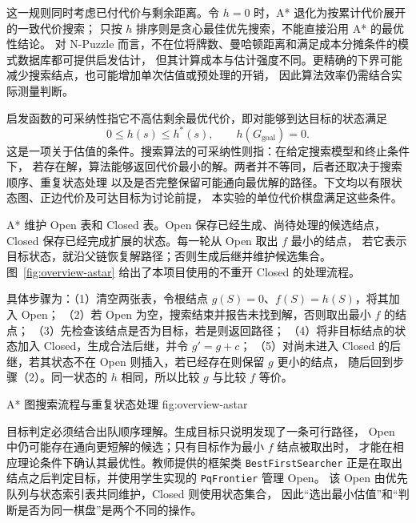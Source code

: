 这一规则同时考虑已付代价与剩余距离。令 $h=0$ 时，A* 退化为按累计代价展开的一致代价搜索；
只按 $h$ 排序则是贪心最佳优先搜索，不能直接沿用 A* 的最优性结论。
对 N-Puzzle 而言，不在位将牌数、曼哈顿距离和满足成本分摊条件的模式数据库都可提供启发估计，
但其计算成本与估计强度不同。更精确的下界可能减少搜索结点，也可能增加单次估值或预处理的开销，
因此算法效率仍需结合实际测量判断。


启发函数的可采纳性指它不高估剩余最优代价，即对能够到达目标的状态满足
\begin{equation}
  0\leq h(s)\leq h^*(s),\qquad h(G_{\mathrm{goal}})=0.
  \label{eq:overview-admissible}
\end{equation}
这是一项关于估值的条件。搜索算法的可采纳性则指：在给定搜索模型和终止条件下，
若存在解，算法能够返回代价最小的解。两者并不等同，后者还取决于搜索顺序、重复状态处理
以及是否完整保留可能通向最优解的路径。下文均以有限状态图、正边代价及可达目标为讨论前提，
本实验的单位代价棋盘满足这些条件。


A* 维护 Open 表和 Closed 表。Open 保存已经生成、尚待处理的候选结点，
Closed 保存已经完成扩展的状态。每一轮从 Open 取出 $f$ 最小的结点，
若它表示目标状态，就沿父链恢复解路径；否则生成后继并维护候选集合。
图~\ref{fig:overview-astar} 给出了本项目使用的不重开 Closed 的处理流程。

具体步骤为：（1）清空两张表，令根结点 $g(S)=0$、$f(S)=h(S)$，将其加入 Open；
（2）若 Open 为空，搜索结束并报告未找到解，否则取出最小 $f$ 的结点；
（3）先检查该结点是否为目标，若是则返回路径；
（4）将非目标结点的状态加入 Closed，生成合法后继，并令 $g'=g+c$；
（5）对尚未进入 Closed 的后继，若其状态不在 Open 则插入，若已经存在则保留 $g$ 更小的结点，
随后回到步骤（2）。同一状态的 $h$ 相同，所以比较 $g$ 与比较 $f$ 等价。

  {A* 图搜索流程与重复状态处理}
  {fig:overview-astar}

目标判定必须结合出队顺序理解。生成目标只说明发现了一条可行路径，
Open 中仍可能存在通向更短解的候选；只有目标作为最小 $f$ 结点被取出时，
才能在相应理论条件下确认其最优性。教师提供的框架类 \texttt{BestFirstSearcher}
正是在取出结点之后判定目标，并使用学生实现的 \texttt{PqFrontier} 管理 Open。
该 Open 由优先队列与状态索引表共同维护，Closed 则使用状态集合，
因此“选出最小估值”和“判断是否为同一棋盘”是两个不同的操作。
\FloatBarrier


